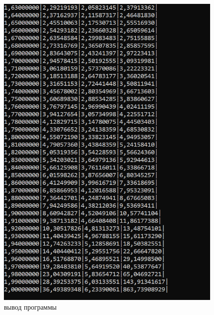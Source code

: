 \begin{figure}[ht!]
  \centering
  \includegraphics[scale=1]{img/result_table2.png}
  \caption{вывод программы}
  \label{fig:fig3}
\end{figure}

\newpage